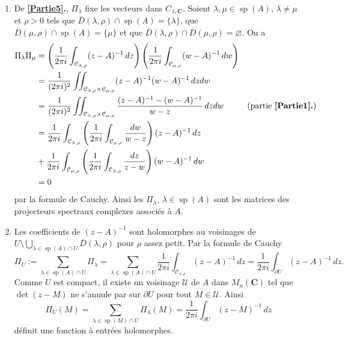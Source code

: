 \documentclass[french, 12pt]{article}
\theoremstyle{definition}
\newcommand{\tuple}[1]{\left(#1\right)}
\newcommand{\ol}[1]{\overline{#1}}
\newcommand{\Cbb}{\mathbf{C}}
\newcommand{\Ccal}{\mathcal{C}}
\newcommand{\Ucal}{\mathcal{U}}
\newcommand{\spec}{\operatorname{sp}}
\begin{document}
\begin{enumerate}
    \item \label{Partie6} De {\bf \ref{Partie5}.}, $\Pi_\lambda$ fixe les vecteurs dans $C_{\lambda,\Cbb}$. Soient $\lambda, \mu \in \spec(A)$, $\lambda \neq \mu$ et $\rho > 0$ tels que $\ol{D}(\lambda,\rho) \cap \spec(A) = \{\lambda\}$, que $\ol{D}(\mu,\rho) \cap \spec(A) = \{\mu\}$ et que $\ol{D}(\lambda,\rho) \cap \ol{D}(\mu,\rho) = \varnothing$. On a
        \begin{align*}
            \allowdisplaybreaks
            \Pi_\lambda \Pi_\mu & = \tuple{\frac{1}{2\pi i} \int_{\Ccal_{\lambda,\rho}} (z - A)^{-1}\,dz}\tuple{\frac{1}{2\pi i} \int_{\Ccal_{\mu,\rho}} (w - A)^{-1}\,dw} \\
            & = \frac{1}{(2\pi i)^2} \iint_{\Ccal_{\lambda,\rho} \times \Ccal_{\mu,\rho}} (z - A)^{-1}(w - A)^{-1} \,dzdw \\
            & = \frac{1}{(2\pi i)^2}\iint_{\Ccal_{\lambda,\rho} \times \Ccal_{\mu,\rho}} \frac{(z - A)^{-1} - (w - A)^{-1}}{w - z}\,dzdw & \text{(partie {\bf\ref{Partie1}.})}\\
            & = \frac{1}{2\pi i}\int_{\Ccal_{\lambda,\rho}} \tuple{\frac{1}{2\pi i}\int_{\Ccal_{\mu,\rho}}\frac{dw}{w - z}} (z-A)^{-1}\,dz \\
            & + \frac{1}{2\pi i}\int_{\Ccal_{\mu,\rho}} \tuple{\frac{1}{2\pi i}\int_{\Ccal_{\lambda,\rho}}\frac{dz}{z - w}} (w-A)^{-1}\,dw\\
            & = 0
        \end{align*}
    par la formule de Cauchy. Ainsi les $\Pi_\lambda$, $\lambda \in \spec(A)$ sont les matrices des projecteurs spectraux complexes associ\'es \`a $A$.
    
    \item \label{Partie7} Les coefficients de $(z-A)^{-1}$ sont holomorphes au voisinages de $U \setminus \bigcup\limits_{\lambda \in \spec(A) \cap U} \ol{D}(\lambda,\rho)$ pour $\rho$ assez petit. Par la formule de Cauchy
        $$\Pi_U := \sum_{\lambda \in \spec(A) \cap U} \Pi_\lambda = \sum_{\lambda \in \spec(A) \cap U} \frac{1}{2\pi i} \int_{\Ccal_{\lambda,\rho}} (z - A)^{-1}\,dz = \frac{1}{2\pi i} \int_{\partial U} (z - A)^{-1}\,dz.$$
    Comme $U$ est compact, il existe un voisinage $\Ucal$ de $A$ dans $M_n(\Cbb)$ tel que $\det(z-M)$ ne s'annule par sur $\partial U$ pour tout $M \in \Ucal$. Ainsi
        $$\Pi_U(M) = \sum_{\lambda \in \spec(M) \cap U} \Pi_\lambda(M) = \frac{1}{2\pi i} \int_{\partial U} (z - M)^{-1}\,dz$$
    d\'efinit une fonction \`a entr\'ees holomorphes.
    

\end{enumerate}
\end{document}
